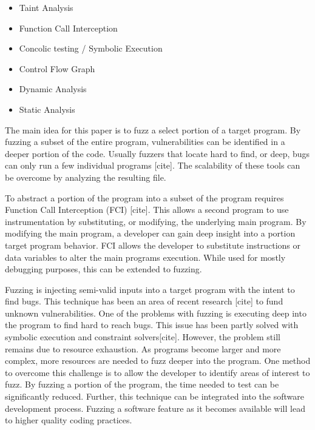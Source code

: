 \documentclass[conference]{IEEEtran}
\begin{document}
\begin{itemize}
\item Taint Analysis
\item Function Call Interception
\item Concolic testing / Symbolic Execution
\item Control Flow Graph
\item Dynamic Analysis
\item Static Analysis
\end{itemize}

The main idea for this paper is to fuzz a select portion of a target program. By fuzzing a subset of the entire program, vulnerabilities can be identified in a deeper portion of the code. Usually fuzzers that locate hard to find, or deep, bugs can only run a few individual programs [cite]. The scalability of these tools can be overcome by analyzing the resulting file. 

To abstract a portion of the program into a subset of the program requires Function Call Interception (FCI) [cite]. This allows a second program to use instrumentation by substituting, or modifying, the underlying main program. By modifying the main program, a developer can gain deep insight into a portion target program behavior. FCI allows the developer to substitute instructions or data variables to alter the main programs execution. While used for mostly debugging purposes, this can be extended to fuzzing.

Fuzzing is injecting semi-valid inputs into a target program with the intent to find bugs. This technique has been an area of recent research [cite] to fund unknown vulnerabilities. One of the problems with fuzzing is executing deep into the program to find hard to reach bugs. This issue has been partly solved with symbolic execution and constraint solvers[cite]. However, the problem still remains due to resource exhaustion. As programs become larger and more complex, more resources are needed to fuzz deeper into the program. One method to overcome this challenge is to allow the developer to identify areas of interest to fuzz. By fuzzing a portion of the program, the time needed to test can be significantly reduced. Further, this technique can be integrated into the software development process. Fuzzing a software feature as it becomes available will lead to higher quality coding practices. 
\end{document}
